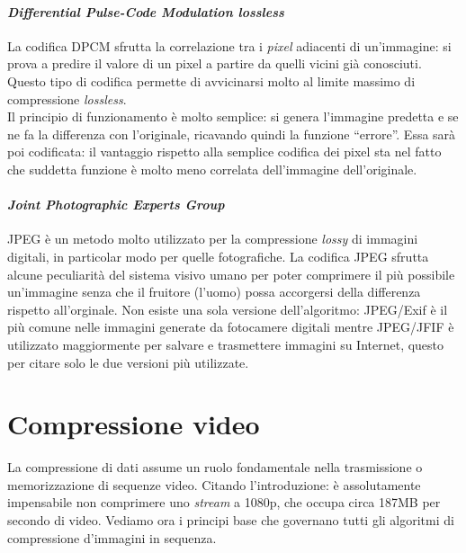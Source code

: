 \paragraph{\textit{Differential Pulse-Code Modulation lossless} \\}
  La codifica DPCM sfrutta la correlazione tra i \emph{pixel} adiacenti di 
  un'immagine: si prova a predire il valore di un pixel a partire da quelli 
  vicini già conosciuti. Questo tipo di codifica permette di avvicinarsi molto 
  al limite massimo di compressione \emph{lossless}.\\
  Il principio di funzionamento è molto semplice: si genera l'immagine predetta 
  e se ne fa la differenza con l'originale, ricavando quindi la funzione 
  ``errore''. Essa sarà poi codificata: il vantaggio rispetto alla semplice 
  codifica dei pixel sta nel fatto che suddetta funzione è molto meno correlata 
  dell'immagine dell'originale.

\paragraph{\textit{Joint Photographic Experts Group} \\}
  JPEG è un metodo molto utilizzato per la compressione \emph{lossy} di 
  immagini digitali, in particolar modo per quelle fotografiche. La codifica 
  JPEG sfrutta alcune peculiarità del sistema visivo umano per poter comprimere 
  il più possibile un'immagine senza che il fruitore (l'uomo) possa accorgersi 
  della differenza rispetto all'orginale. Non esiste una sola versione 
  dell'algoritmo: JPEG/Exif è il più comune nelle immagini generate da 
  fotocamere digitali mentre JPEG/JFIF è utilizzato maggiormente per salvare e 
  trasmettere immagini su Internet, questo per citare solo le due versioni più 
  utilizzate.



\section{Compressione video}

La compressione di dati assume un ruolo fondamentale nella trasmissione o 
memorizzazione di sequenze video. Citando l'introduzione: è assolutamente 
impensabile non comprimere uno \emph{stream} a 1080p, che occupa circa 187MB 
per secondo di video. Vediamo ora i principi base che governano tutti gli 
algoritmi di compressione d'immagini in sequenza.

